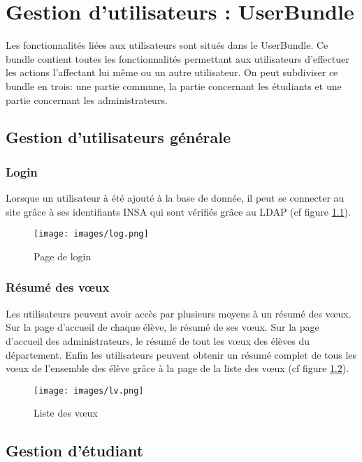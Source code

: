 \chapter{Gestion d'utilisateurs : UserBundle}

Les fonctionnalités liées aux utilisateurs sont situés dans le UserBundle. Ce bundle contient toutes les fonctionnalités permettant aux utilisateurs d'effectuer les actions l'affectant lui même ou un autre utilisateur. On peut subdiviser ce bundle en trois: une partie commune, la partie concernant les étudiants et une partie concernant les administrateurs.

\section{Gestion d'utilisateurs générale}

\subsection{Login}

Lorsque un utilisateur à été ajouté à la base de donnée, il peut se connecter au site grâce à ses identifiants INSA qui sont vérifiés grâce au LDAP (cf figure \ref{log}).

\begin{figure}[H]
	\centering
	\texttt{[image: images/log.png]}
	\caption{Page de login}
	\label{log}
\end{figure}

\subsection{Résumé des vœux}

Les utilisateurs peuvent avoir accès par plusieurs moyens à un résumé des vœux. Sur la page d'accueil de chaque élève, le résumé de ses vœux. Sur la page d'accueil des administrateurs, le résumé de tout les vœux des élèves du département. Enfin les utilisateurs peuvent obtenir un résumé complet de tous les vœux de l'ensemble des élève grâce à la page de la liste des vœux (cf figure \ref{lv}).

\begin{figure}[H]
	\centering
	\texttt{[image: images/lv.png]}
	\caption{Liste des vœux}
	\label{lv}
\end{figure}

\section{Gestion d'étudiant}

